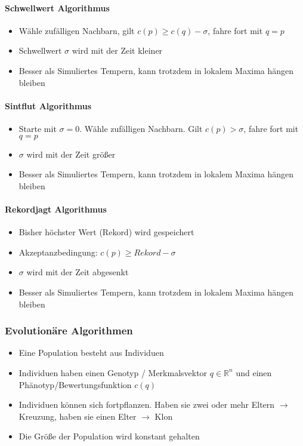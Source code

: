 \paragraph{Schwellwert Algorithmus}
\begin{itemize}
	\item Wähle zufälligen Nachbarn, gilt \(c(p) \geq c(q) - \sigma\), fahre fort mit \(q = p\)
	\item Schwellwert \(\sigma\) wird mit der Zeit kleiner
	\item Besser als Simuliertes Tempern, kann trotzdem in lokalem Maxima hängen bleiben
\end{itemize}

\paragraph{Sintflut Algorithmus}
\begin{itemize}
	\item Starte mit $\sigma = 0$. Wähle zufälligen Nachbarn. Gilt $c(p) > \sigma$, fahre fort mit $q = p$
	\item $\sigma$ wird mit der Zeit größer
	\item Besser als Simuliertes Tempern, kann trotzdem in lokalem Maxima hängen bleiben
\end{itemize}

\paragraph{Rekordjagt Algorithmus}
\begin{itemize}
	\item Bisher höchster Wert (Rekord) wird gespeichert
	\item Akzeptanzbedingung: \(c(p) \geq Rekord - \sigma\)
	\item \(\sigma\) wird mit der Zeit abgesenkt
	\item Besser als Simuliertes Tempern, kann trotzdem in lokalem Maxima hängen bleiben
\end{itemize}

\subsubsection{Evolutionäre Algorithmen}
\begin{itemize}
	\item Eine Population besteht aus Individuen
	\item Individuen haben einen Genotyp / Merkmalsvektor \(q \in \mathbb{R}^n\) und einen Phänotyp/Bewertungsfunktion \(c(q)\)
	\item Individuen können sich fortpflanzen. Haben sie zwei oder mehr Eltern $\rightarrow$ Kreuzung, haben sie einen Elter $\rightarrow$ Klon
	\item Die Größe der Population wird konstant gehalten
\end{itemize}

